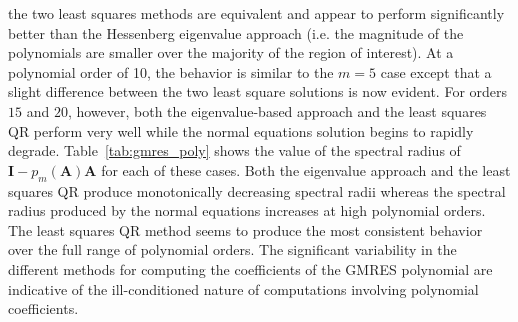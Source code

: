\documentclass[10pt]{article}
\newcommand{\bA}{\ensuremath{\mathbf{A}}}
\newcommand{\bI}{\ensuremath{\mathbf{I}}}
\begin{document}
the two least squares methods are equivalent and appear to perform
significantly better than the Hessenberg eigenvalue approach
(i.e. the magnitude of the polynomials are smaller over the majority
of the region of interest).  At a polynomial order of 10, the behavior
is similar to the $m=5$ case except that a slight difference between the
two least square solutions is now evident.
For orders $15$ and $20$, however, both the eigenvalue-based approach
and the least squares QR perform very well while the normal equations
solution begins to rapidly degrade.
Table~\ref{tab:gmres_poly} shows the value
of the spectral radius of $\bI - p_m(\bA) \bA$ for each
of these cases.  Both the eigenvalue approach and the least squares QR
produce monotonically decreasing spectral radii whereas the spectral
radius produced by the normal equations increases at high polynomial
orders.  The least squares QR method seems to produce the most consistent
behavior over the full range of polynomial orders.
The significant variability in the different methods for computing the
coefficients of the GMRES polynomial are indicative of the ill-conditioned
nature of computations involving polynomial coefficients.
\end{document}
